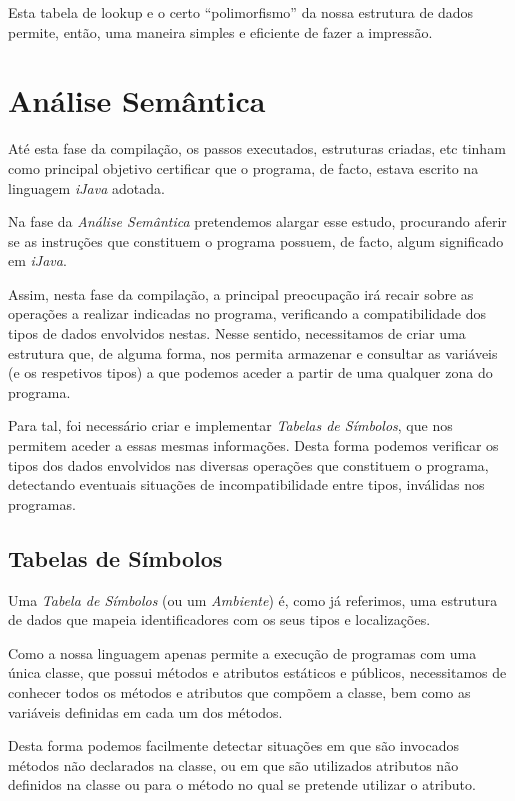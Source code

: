 \documentclass[11pt,a4paper]{article}
\begin{document}
Esta tabela de lookup e o certo ``polimorfismo'' da nossa estrutura de dados permite, então, uma maneira simples e eficiente de fazer a impressão.

\pagebreak

\section{Análise Semântica}

	Até esta fase da compilação, os passos executados, estruturas criadas, etc tinham como principal objetivo certificar que o programa, de facto, estava escrito na linguagem \emph{iJava} adotada.
	
	Na fase da \emph{Análise Semântica} pretendemos alargar esse estudo, procurando aferir se as instruções que constituem o programa possuem, de facto, algum significado em \emph{iJava}.
	
	Assim, nesta fase da compilação, a principal preocupação irá recair sobre as operações a realizar indicadas no programa, verificando a compatibilidade dos tipos de dados envolvidos nestas. Nesse sentido, necessitamos de criar uma estrutura que, de alguma forma, nos permita armazenar e consultar as variáveis (e os respetivos tipos) a que podemos aceder a partir de uma qualquer zona do programa.
	
	Para tal, foi necessário criar e implementar \emph{Tabelas de Símbolos}, que nos permitem aceder a essas mesmas informações. Desta forma podemos verificar os tipos dos dados envolvidos nas diversas operações que constituem o programa, detectando eventuais situações de incompatibilidade entre tipos, inválidas nos programas.

	\subsection{Tabelas de Símbolos}
	
	Uma \emph{Tabela de Símbolos} (ou um \emph{Ambiente}) é, como já referimos, uma estrutura de dados que mapeia identificadores com os seus tipos e localizações.
	
	Como a nossa linguagem apenas permite a execução de programas com uma única classe, que possui métodos e atributos estáticos e públicos, necessitamos de conhecer todos os métodos e atributos que compõem a classe, bem como as variáveis definidas em cada um dos métodos.
	
	Desta forma podemos facilmente detectar situações em que são invocados métodos não declarados na classe, ou em que são utilizados atributos não definidos na classe ou para o método no qual se pretende utilizar o atributo. 
\end{document}

